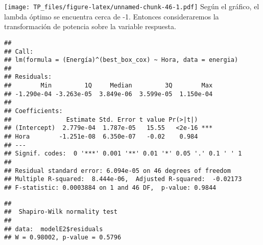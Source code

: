 \documentclass[
]{article}
\newenvironment{Shaded}{\begin{snugshade}}{\end{snugshade}}
\newcommand{\AttributeTok}[1]{\textcolor[rgb]{0.77,0.63,0.00}{#1}}
\newcommand{\CommentTok}[1]{\textcolor[rgb]{0.56,0.35,0.01}{\textit{#1}}}
\newcommand{\FunctionTok}[1]{\textcolor[rgb]{0.00,0.00,0.00}{#1}}
\newcommand{\NormalTok}[1]{#1}
\newcommand{\OtherTok}[1]{\textcolor[rgb]{0.56,0.35,0.01}{#1}}
\newcommand{\SpecialCharTok}[1]{\textcolor[rgb]{0.00,0.00,0.00}{#1}}
\begin{document}
\texttt{[image: TP\_files/figure-latex/unnamed-chunk-46-1.pdf]} Según el
gráfico, el lambda óptimo se encuentra cerca de -1. Entonces
consideraremos la transformación de potencia sobre la variable
respuesta.

\begin{Shaded}
\end{Shaded}

\begin{verbatim}
## 
## Call:
## lm(formula = (Energía)^(best_box_cox) ~ Hora, data = energia)
## 
## Residuals:
##        Min         1Q     Median         3Q        Max 
## -1.290e-04 -3.263e-05  3.849e-06  3.599e-05  1.150e-04 
## 
## Coefficients:
##               Estimate Std. Error t value Pr(>|t|)    
## (Intercept)  2.779e-04  1.787e-05   15.55   <2e-16 ***
## Hora        -1.251e-08  6.350e-07   -0.02    0.984    
## ---
## Signif. codes:  0 '***' 0.001 '**' 0.01 '*' 0.05 '.' 0.1 ' ' 1
## 
## Residual standard error: 6.094e-05 on 46 degrees of freedom
## Multiple R-squared:  8.444e-06,  Adjusted R-squared:  -0.02173 
## F-statistic: 0.0003884 on 1 and 46 DF,  p-value: 0.9844
\end{verbatim}

\begin{Shaded}
\end{Shaded}

\begin{verbatim}
## 
##  Shapiro-Wilk normality test
## 
## data:  modelE2$residuals
## W = 0.98002, p-value = 0.5796
\end{verbatim}
\end{document}
